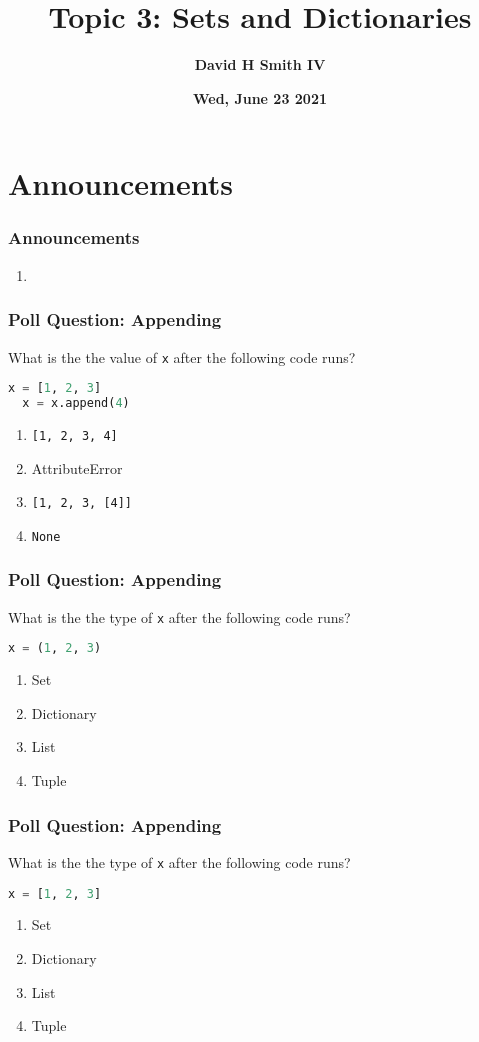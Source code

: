 \documentclass[xcolor=table]{beamer}
\title{\textbf{Topic 3: Sets and Dictionaries}}
\author{\textbf{David H Smith IV}}
\institute[\textbf{UIUC}]{\textbf{University of Illinois Urbana-Champaign}}
\date{\textbf{Wed, June 23 2021}}
\begin{document}
\frame{\titlepage}

\section{Announcements}

%
%
\begin{frame}
  \frametitle{Announcements}
  \begin{enumerate}
    \item 
  \end{enumerate}
\end{frame}

%
%
\begin{frame}[fragile]
  \frametitle{Poll Question: Appending}
  What is the the value of \lstinline|x| after the following code runs?
  \begin{lstlisting}[language=Python, autogobble]
  x = [1, 2, 3]
  x = x.append(4)
  \end{lstlisting}
  \vfill
  \begin{enumerate}[A] 
    \item \lstinline|[1, 2, 3, 4]|
    \item AttributeError
    \item \lstinline|[1, 2, 3, [4]]|
    \item \lstinline|None|
  \end{enumerate}
\end{frame}

%
%
\begin{frame}[fragile]
  \frametitle{Poll Question: Appending}
  What is the the type of \lstinline|x| after the following code runs?
  \begin{lstlisting}[language=Python, autogobble]
  x = (1, 2, 3)
  \end{lstlisting}
  \vfill
  \begin{enumerate}[A] 
    \item Set
    \item Dictionary
    \item List
    \item Tuple
  \end{enumerate}
\end{frame}

%
%
\begin{frame}[fragile]
  \frametitle{Poll Question: Appending}
  What is the the type of \lstinline|x| after the following code runs?
  \begin{lstlisting}[language=Python, autogobble]
  x = [1, 2, 3]
  \end{lstlisting}
  \vfill
  \begin{enumerate}[A] 
    \item Set
    \item Dictionary
    \item List
    \item Tuple
  \end{enumerate}
\end{frame}
\end{document}
